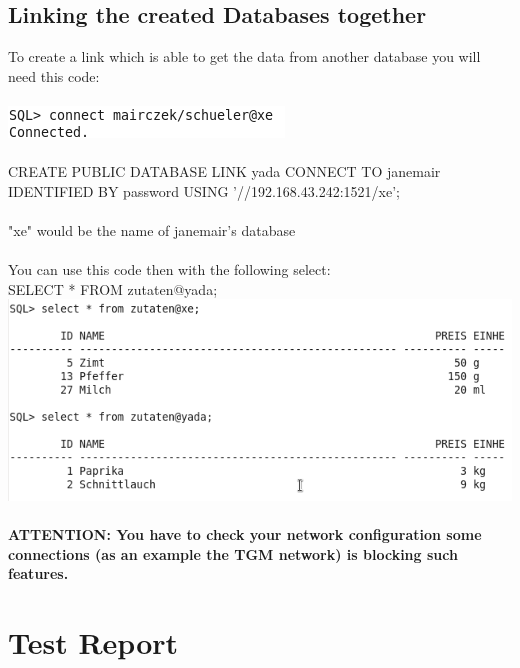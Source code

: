 \documentclass[11pt,a4paper]{article}
\begin{document}
\subsection{Linking the created Databases together}
To create a link which is able to get the data from another database you will need this code:\\ \\
\includegraphics{connected} \\ \\
CREATE PUBLIC DATABASE LINK yada
CONNECT TO janemair IDENTIFIED BY password
USING '//192.168.43.242:1521/xe';\\ \\
"xe" would be the name of janemair's database \\ \\
\newpage
You can use this code then with the following select:\\

SELECT * FROM zutaten@yada;\\

\includegraphics{selects} \\ \\
\bf ATTENTION: You have to check your network configuration some connections (as an example the TGM network) is blocking such features. \\
\newpage

\section{Test Report}
\newpage



\end{document}
